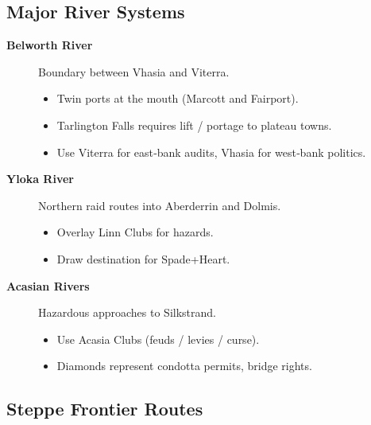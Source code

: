 \subsection{Major River Systems}\label{subsec:river_systems}

\begin{description}
    \item[\textbf{Belworth River}] Boundary between Vhasia and Viterra.
        \begin{itemize}
            \item Twin ports at the mouth (Marcott and Fairport).
            \item Tarlington Falls requires lift / portage to plateau towns.
            \item Use Viterra for east‑bank audits, Vhasia for west‑bank politics.
        \end{itemize}
    \item[\textbf{Yloka River}] Northern raid routes into Aberderrin and Dolmis.
        \begin{itemize}
            \item Overlay Linn Clubs for hazards.
            \item Draw destination for Spade+Heart.
        \end{itemize}
    \item[\textbf{Acasian Rivers}] Hazardous approaches to Silkstrand.
        \begin{itemize}
            \item Use Acasia Clubs (feuds / levies / curse).
            \item Diamonds represent condotta permits, bridge rights.
        \end{itemize}
\end{description}

\subsection{Steppe Frontier Routes}\label{subsec:steppe_frontiers}

